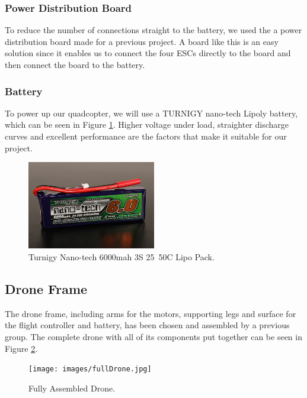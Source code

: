 \subsubsection{Power Distribution Board}
To reduce the number of connections straight to the battery, we used the a power distribution board made for a previous project. A board like this is an easy solution since it enables us to connect the four ESCs directly to the board and then connect the board to the battery.

\clearpage

\subsubsection{Battery}
To power up our quadcopter, we will use a TURNIGY nano-tech Lipoly battery, which can be seen in Figure \ref{battery}. Higher voltage under load, straighter discharge curves and excellent performance are the factors that make it suitable for our project. 

\begin{figure}[H]
  \centering
    \includegraphics[width=0.5\textwidth]{images/battery.jpg}
	\caption{Turnigy Nano-tech 6000mah 3S 25~50C Lipo Pack.}
	\label{battery}
\end{figure}

\subsection{Drone Frame}
The drone frame, including arms for the motors, supporting legs and surface for the flight controller and battery, has been chosen and assembled by a previous group. The complete drone with all of its components put together can be seen in Figure \ref{fullDrone}.

\begin{figure}[H]
  \centering
    \texttt{[image: images/fullDrone.jpg]}
	\caption{Fully Assembled Drone.}
	\label{fullDrone}
\end{figure}

